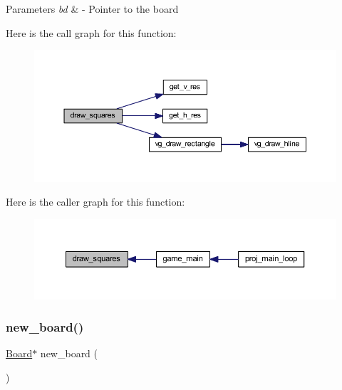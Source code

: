 \begin{DoxyParams}{Parameters}
{\em bd} & -\/ Pointer to the board \\
\hline
\end{DoxyParams}
Here is the call graph for this function\+:
\nopagebreak
\begin{figure}[H]
\begin{center}
\leavevmode
\includegraphics[width=350pt]{group__tetramino_ga64e78e0b93dcd6d9b3092b4b8d1fd339_cgraph}
\end{center}
\end{figure}
Here is the caller graph for this function\+:
\nopagebreak
\begin{figure}[H]
\begin{center}
\leavevmode
\includegraphics[width=350pt]{group__tetramino_ga64e78e0b93dcd6d9b3092b4b8d1fd339_icgraph}
\end{center}
\end{figure}
\mbox{\label{group__tetramino_ga3d4977293a2989f9483b897b1a5bd073}} 
\subsubsection{\texorpdfstring{new\+\_\+board()}{new\_board()}}
{\footnotesize\ttfamily \mbox{\hyperlink{struct_board}{Board}}$\ast$ new\+\_\+board (\begin{DoxyParamCaption}{ }\end{DoxyParamCaption})}



